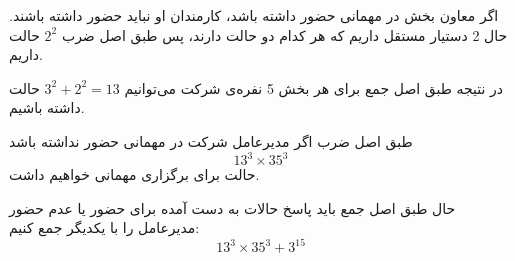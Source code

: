 \begin{enumerate}
\begin{itemize}
        \p
        \p
        
        اگر معاون بخش در مهمانی حضور داشته باشد، کارمندان او نباید حضور داشته باشند. حال 2 دستیار مستقل داریم که هر کدام دو حالت دارند، پس طبق اصل ضرب $2^2$ حالت داریم.

        \p
        \p
        
        در نتیجه طبق اصل جمع برای هر بخش 5 نفره‌ی شرکت می‌توانیم
        $ 3^2 + 2^2 = 13 $
        حالت داشته باشیم.
    \end{itemize}
    
    \p
    طبق اصل ضرب اگر مدیرعامل شرکت در مهمانی حضور نداشته باشد
    $$ 13^3 \times  35 ^ 3 $$
    حالت برای برگزاری مهمانی خواهیم داشت.
    
\end{enumerate}
    
\p
حال طبق اصل جمع باید پاسخ حالات به دست آمده برای حضور یا عدم حضور مدیرعامل را با یکدیگر جمع کنیم:   
$$13^3 \times  35 ^ 3  + 3^{15}$$

